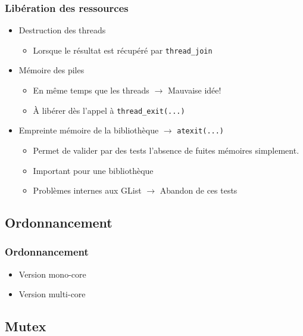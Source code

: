 \documentclass{beamer}
\begin{document}
\begin{frame}[containsverbatim]
  \frametitle{Libération des ressources}
  \begin{itemize}
  \item Destruction des threads
    \begin{itemize}
      \item Lorsque le résultat est récupéré par \verb!thread_join!
    \end{itemize}
  \item Mémoire des piles
    \begin{itemize}
    \item En même temps que les threads $\rightarrow $ Mauvaise idée!
    \item À libérer dès l'appel à \verb!thread_exit(...)!
    \end{itemize}
  \item Empreinte mémoire de la bibliothèque
    $\rightarrow $ \verb!atexit(...)!
    \begin{itemize}
      \item Permet de valider par des tests l'absence de fuites mémoires
        simplement.
      \item Important pour une bibliothèque
      \item Problèmes internes aux GList $\rightarrow $ Abandon de ces tests
    \end{itemize}
  \end{itemize}
\end{frame}

\subsection{Ordonnancement}

\begin{frame}
  \frametitle{Ordonnancement}
  \begin{itemize}
    \item Version mono-core
    \item Version multi-core
  \end{itemize}
\end{frame}

\subsection{Mutex}
\end{document}
